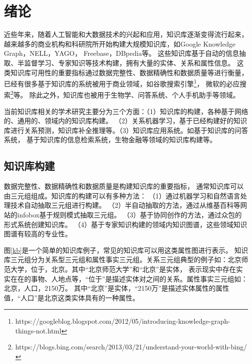 

\chapter{绪论}
\label{cha:intro}
近些年来，随着人工智能和大数据技术的兴起和应用，知识库逐渐变得流行起来，越来越多的商业机构和科研院所开始构建大规模知识库，如Google Knowledge Graph\cite{Dong}，NELL\cite{NELL-aaai15}，YAGO\cite{Suchanek:2007:YCS:1242572.1242667}，
Freebase\cite{Bollacker:2008:FCC:1376616.1376746}，DBpedia\cite{Bizer:2009:DCP:1640541.1640848}等。
这些知识库基于自动的信息抽取、半监督学习、专家知识等技术构建，拥有大量的实体、关系和属性信息。
这类知识库可用性的重要指标通过数据完整性、数据精确性和数据质量等进行衡量，
已经有很多基于知识库的系统被用于商业领域，如谷歌搜索引擎\footnote{https://googleblog.blogspot.com/2012/05/introducing-knowledge-graph-things-not.html}，
微软的必应搜索\footnote{https://blogs.bing.com/search/2013/03/21/understand-your-world-with-bing/}等。
除此之外，知识库也被用于生物学\cite{Dumontier:2014:BRL:2878453.2878554}、问答系统、个人手机助手等领域。

当前知识库相关的学术研究主要分为三个方面：（1）知识库的构建，各种基于网络的、通用的、领域内的知识库构建。
（2）关系机器学习，基于已经构建好的知识库进行关系预测，知识库补全推理等。（3）知识库应用系统。如基于知识库的问答系统，
基于知识库的信息检索系统，生物金融等领域的知识库构建等。

\section{知识库构建}
数据完整性、数据精确性和数据质量是构建知识库的重要指标，
通常知识库可以由三元组组成。知识库的构建可以有多种方法：
（1）通过机器学习和自然语言处理技术自动抽取三元组\cite{Weikum2010FromIT}进行构建。
（2）半自动抽取的方法，通过从维基百科等网站的infobox基于规则模式抽取三元组。
（3）基于协同创作\cite{Vrandecic2014WikidataAF}的方法，通过众包的形式系统创建知识库。
（4）基于专家知识构建的领域内知识图谱，这些领域知识图谱有较高的专业性。

图\ref{kb}是一个简单的知识库例子，常见的知识库可以用这类属性图进行表示。
知识库三元组分为关系型三元组和属性事实三元组。关系三元组典型的例子如：北京师范大学，位于，北京。其中“北京师范大学”和“北京”是实体，
表示现实中存在实实在在的事物、人地点等，“位于”是描述实体对之间的关系。属性事实三元组如：北京，人口，2150万。
其中“北京”是实体，“2150万”是描述实体属性的属性值，“人口”是北京这类实体具有的一种属性。

